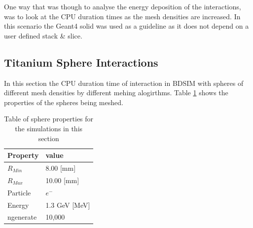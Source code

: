\documentclass[12pt,a4paper]{article}
\begin{document}
\noindent One way that was though to analyse the energy deposition of the interactions, was to look at the CPU duration times as the mesh densities are increased. In this scenario the Geant4 solid was used as a guideline as it does not depend on a user defined stack \& slice. 


\subsection{Titanium Sphere Interactions}

In this section the CPU duration time of interaction in BDSIM with spheres of different mesh densities by different mehing alogirthms. Table \ref{tab1} shows the properties of the spheres being meshed.
 
\begin{table}[h!]
\centering
\begin{tabular}{|l|l|}
\hline
Property & value \\ \hline
$R_{Min}$ &  8.00 [mm]\\ \hline
$R_{Max}$ &  10.00 [mm]\\ \hline
Particle &  $e^-$\\ \hline
Energy & 1.3 GeV [MeV]\\ \hline
ngenerate & 10,000\\ \hline
\end{tabular}
\caption{Table of sphere properties for the simulations in this section}
\label{tab1}
\end{table}
\end{document}
